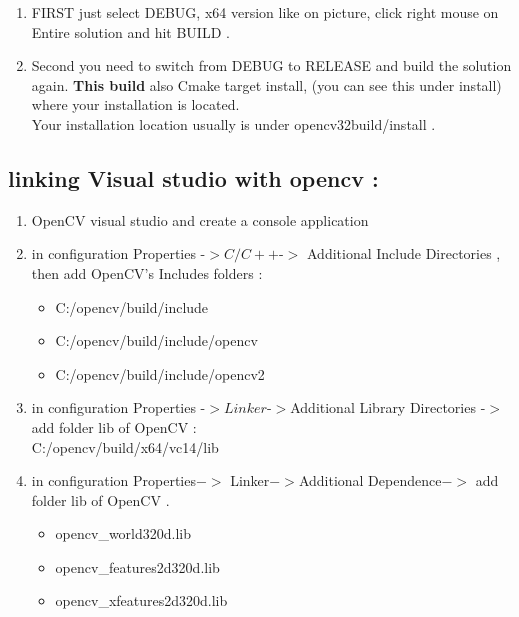 \begin{enumerate}
\item FIRST just select DEBUG, x64 version like on picture, click right mouse on Entire solution and hit BUILD  . 

\item 	Second you need to switch from DEBUG to RELEASE and build the solution again. \textbf{This build} also Cmake target install, (you can see this under install) where  your installation is located. \\
Your installation location usually is under opencv32build/install .

\end{enumerate}

\subsection{linking Visual studio with opencv :}

\begin{enumerate}
\item OpenCV visual studio and create a console application 
\item in configuration Properties -$> C/C++ $-$>$ Additional Include Directories , then add OpenCV's Includes folders :
 \begin{itemize}
     \item C:/opencv/build/include
     \item C:/opencv/build/include/opencv
     \item C:/opencv/build/include/opencv2
   \end{itemize}
\item in configuration Properties -$>Linker$-$>$Additional Library Directories -$> $ add folder lib of OpenCV :\\
     C:/opencv/build/x64/vc14/lib 
\item in configuration Properties$->$ Linker$->$Additional Dependence$->$ add folder lib of OpenCV .
 \begin{itemize}
     \item opencv\_world320d.lib
     \item opencv\_features2d320d.lib
     \item opencv\_xfeatures2d320d.lib
   \end{itemize}

\end{enumerate}

